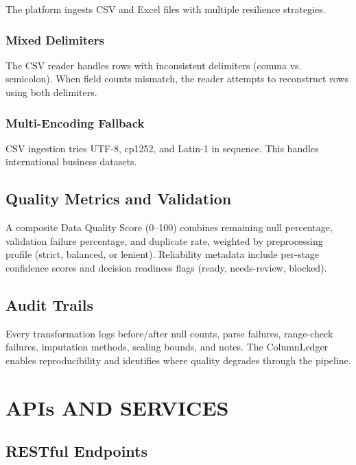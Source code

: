 \documentclass[12pt,a4paper,openany]{report}
\begin{document}
The platform ingests CSV and Excel files with multiple resilience strategies.

\subsection{Mixed Delimiters}

The CSV reader handles rows with inconsistent delimiters (comma vs. semicolon). When field counts mismatch, the reader attempts to reconstruct rows using both delimiters.

\subsection{Multi-Encoding Fallback}

CSV ingestion tries UTF-8, cp1252, and Latin-1 in sequence. This handles international business datasets.

\section{Quality Metrics and Validation}

A composite Data Quality Score (0--100) combines remaining null percentage, validation failure percentage, and duplicate rate, weighted by preprocessing profile (strict, balanced, or lenient). Reliability metadata include per-stage confidence scores and decision readiness flags (ready, needs-review, blocked).

\section{Audit Trails}

Every transformation logs before/after null counts, parse failures, range-check failures, imputation methods, scaling bounds, and notes. The ColumnLedger enables reproducibility and identifies where quality degrades through the pipeline.

\chapter{APIs AND SERVICES}
\label{ch:apis}

\section{RESTful Endpoints}
\end{document}
